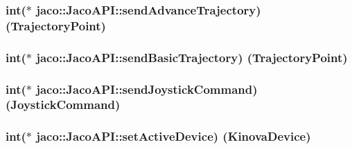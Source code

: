 \subsubsection[{\texorpdfstring{send\+Advance\+Trajectory}{sendAdvanceTrajectory}}]{\setlength{\rightskip}{0pt plus 5cm}int($\ast$ jaco\+::\+Jaco\+A\+P\+I\+::send\+Advance\+Trajectory) ({\bf Trajectory\+Point})}\hypertarget{classjaco_1_1JacoAPI_a30abd0123d85582b684fbd86437d403c}{}\label{classjaco_1_1JacoAPI_a30abd0123d85582b684fbd86437d403c}
\subsubsection[{\texorpdfstring{send\+Basic\+Trajectory}{sendBasicTrajectory}}]{\setlength{\rightskip}{0pt plus 5cm}int($\ast$ jaco\+::\+Jaco\+A\+P\+I\+::send\+Basic\+Trajectory) ({\bf Trajectory\+Point})}\hypertarget{classjaco_1_1JacoAPI_acbaea3e47825b270d85d783c9f29d472}{}\label{classjaco_1_1JacoAPI_acbaea3e47825b270d85d783c9f29d472}
\subsubsection[{\texorpdfstring{send\+Joystick\+Command}{sendJoystickCommand}}]{\setlength{\rightskip}{0pt plus 5cm}int($\ast$ jaco\+::\+Jaco\+A\+P\+I\+::send\+Joystick\+Command) ({\bf Joystick\+Command})}\hypertarget{classjaco_1_1JacoAPI_a57328804ef00fd40492ba065be3fe3f1}{}\label{classjaco_1_1JacoAPI_a57328804ef00fd40492ba065be3fe3f1}
\subsubsection[{\texorpdfstring{set\+Active\+Device}{setActiveDevice}}]{\setlength{\rightskip}{0pt plus 5cm}int($\ast$ jaco\+::\+Jaco\+A\+P\+I\+::set\+Active\+Device) ({\bf Kinova\+Device})}\hypertarget{classjaco_1_1JacoAPI_a4e0c8fc007f20e985545b59abf571ea0}{}\label{classjaco_1_1JacoAPI_a4e0c8fc007f20e985545b59abf571ea0}
